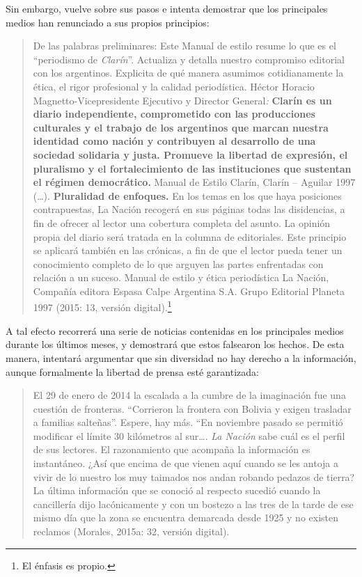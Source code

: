Sin embargo, vuelve sobre sus pasos e intenta demostrar que los principales medios han renunciado a sus propios principios:

\begin{quote}
De las palabras preliminares: Este Manual de estilo resume lo que es el ``periodismo de \emph{Clarín}''. Actualiza y detalla nuestro compromiso editorial con los argentinos. Explicita de qué manera asumimos cotidianamente la ética, el rigor profesional y la calidad periodística. Héctor Horacio Magnetto-Vicepresidente Ejecutivo y Director General\emph{:} \textbf{Clarín es un diario independiente, comprometido con las producciones culturales y el trabajo de los argentinos que marcan nuestra identidad como nación y contribuyen al desarrollo de una sociedad solidaria y justa. Promueve la libertad de expresión, el pluralismo y el fortalecimiento de las instituciones que sustentan el régimen democrático.} Manual de Estilo Clarín, Clarín -- Aguilar 1997 (\ldots). \textbf{Pluralidad de enfoques.} En los temas en los que haya posiciones contrapuestas, La Nación recogerá en sus páginas todas las disidencias, a fin de ofrecer al lector una cobertura completa del asunto. La opinión propia del diario será tratada en la columna de editoriales. Este principio se aplicará también en las crónicas, a fin de que el lector pueda tener un conocimiento completo de lo que arguyen las partes enfrentadas con relación a un suceso. Manual de estilo y ética periodística La Nación, Compañía editora Espasa Calpe Argentina S.A. Grupo Editorial Planeta 1997 (2015: 13, versión digital).\footnote{El énfasis es propio.}
\end{quote}

A tal efecto recorrerá una serie de noticias contenidas en los principales medios durante los últimos meses, y demostrará que estos falsearon los hechos. De esta manera, intentará argumentar que sin diversidad no hay derecho a la información, aunque formalmente la libertad de prensa esté garantizada:

\begin{quote}
El 29 de enero de 2014 la escalada a la cumbre de la imaginación fue una cuestión de fronteras. ``Corrieron la frontera con Bolivia y exigen trasladar a familias salteñas''. Espere, hay más. ``En noviembre pasado se permitió modificar el límite 30 kilómetros al sur\ldots. \emph{La Nación} sabe cuál es el perfil de sus lectores. El razonamiento que acompaña la información es instantáneo. ¿Así que encima de que vienen aquí cuando se les antoja a vivir de lo nuestro los muy taimados nos andan robando pedazos de tierra? La última información que se conoció al respecto sucedió cuando la cancillería dijo lacónicamente y con un bostezo a las tres de la tarde de ese mismo día que la zona se encuentra demarcada desde 1925 y no existen reclamos (Morales, 2015a: 32, versión digital).
\end{quote}

